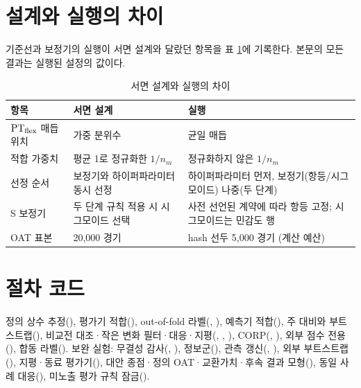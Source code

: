 \section{설계와 실행의 차이}

기준선과 보정기의 실행이 서면 설계와 달랐던 항목을 표 \ref{tab:design-deviations}에 기록한다. 본문의 모든 결과는 실행된 설정의 값이다.

\begin{table}[H]
  \centering
  \caption{서면 설계와 실행의 차이}
  \label{tab:design-deviations}
  \small
  \begin{tabularx}{\linewidth}{@{}lXX@{}}
    \toprule
    항목 & 서면 설계 & 실행 \\
    \midrule
    $\mathrm{PT}_{\mathrm{flex}}$ 매듭 위치 & 가중 분위수 & 균일 매듭 \\
    적합 가중치 & 평균 1로 정규화한 $1/n_m$ & 정규화하지 않은 $1/n_m$ \\
    선정 순서 & 보정기와 하이퍼파라미터 동시 선정 & 하이퍼파라미터 먼저, 보정기(항등/시그모이드) 나중(두 단계) \\
    S 보정기 & 두 단계 규칙 적용 시 시그모이드 선택 & 사전 선언된 계약에 따라 항등 고정; 시그모이드는 민감도 행 \\
    OAT 표본 & 20{,}000 경기 & hash 선두 5{,}000 경기 (계산 예산) \\
  \bottomrule
  \end{tabularx}
\end{table}

\section{절차 코드}

정의 상수 추정(), 평가기 적합(), out-of-fold 라벨(, ), 예측기 적합(), 주 대비와 부트스트랩(), 비교전 대조·작은 변화 필터·대응·지평(, , ), CORP(, ), 외부 점수 전용(), 합동 라벨(). 보완 실험: 무결성 감사(, ), 정보군(), 관측 갱신(, ), 외부 부트스트랩(), 지평·동료 평가기(), 대안 종점·정의 OAT·교환가치·후속 결과 모형(), 동일 사례 대응(), 미노출 평가 규칙 잠금().

